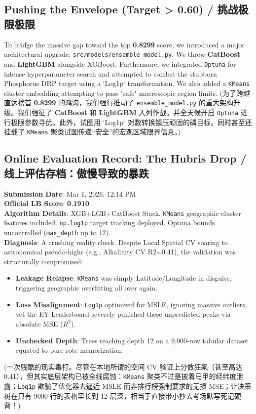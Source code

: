 \subsection{Pushing the Envelope (Target > 0.60) / 挑战极限极限}
To bridge the massive gap toward the top \textbf{0.8299} score, we introduced a major architectural upgrade: \texttt{src/models/ensemble\_model.py}. We threw \textbf{CatBoost} and \textbf{LightGBM} alongside XGBoost. Furthermore, we integrated \texttt{Optuna} for intense hyperparameter search and attempted to combat the stubborn Phosphorus DRP target using a `Log1p` transformation. We also added a \texttt{KMeans} cluster embedding attempting to pass "safe" macroscopic region limits.
(为了跨越直达榜首 \textbf{0.8299} 的鸿沟，我们强行推动了 \texttt{ensemble\_model.py} 的重大架构升级。我们强征了 \textbf{CatBoost} 和 \textbf{LightGBM} 入列作战。并全天候开启 \texttt{Optuna} 进行极限参数寻优。此外，试图用 `Log1p` 对数转换镇压顽固的磷目标。同时甚至还挂载了 \texttt{KMeans} 聚类试图传递“安全”的宏观区域限界信息。)

\subsection{Online Evaluation Record: The Hubris Drop / 线上评估存档：傲慢导致的暴跌}
\begin{warningbox}
\textbf{Submission Date}: Mar 1, 2026, 12:14 PM \\
\textbf{Official LB Score}: \textbf{0.1910} \\
\textbf{Algorithm Details}: XGB+LGB+CatBoost Stack. \texttt{KMeans} geographic cluster features included. \texttt{np.log1p} target tracking deployed. Optuna bounds uncontrolled (\texttt{max\_depth} up to 12). \\
\textbf{Diagnosis}: A crushing reality check. Despite Local Spatial CV soaring to astronomical pseudo-highs (e.g., Alkalinity CV R2=0.41), the validation was structurally compromised:
\begin{itemize}
    \item \textbf{Leakage Relapse}: \texttt{KMeans} was simply Latitude/Longitude in disguise, triggering geographic overfitting all over again.
    \item \textbf{Loss Misalignment}: \texttt{Log1p} optimized for MSLE, ignoring massive outliers, yet the EY Leaderboard severely punished these unpredicted peaks via absolute MSE ($R^2$).
    \item \textbf{Unchecked Depth}: Trees reaching depth 12 on a 9,000-row tabular dataset equated to pure rote memorization. 
\end{itemize}
(一次残酷的现实毒打。尽管在本地所谓的空间 CV 验证上分数狂飙（甚至高达 0.41），但其实底层架构已被全线腐蚀：\texttt{KMeans} 聚类不过是披着马甲的经纬度泄露；\texttt{Log1p} 欺骗了优化器去逼近 MSLE 而非排行榜强制要求的无损 MSE；让决策树在只有 9000 行的表格里长到 12 层深，相当于直接带小抄去考场默写死记硬背！)
\end{warningbox}

